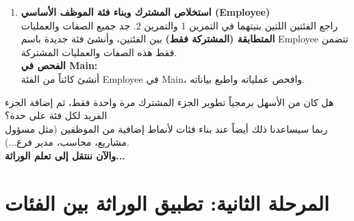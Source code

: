 \documentclass[14pt]{extarticle}
\begin{document}
\begin{enumerate}[label=\textbf{تمرين \arabic*:}, wide=0pt, leftmargin=*, itemsep=2.2em]
    \item \textbf{استخلاص المشترك وبناء فئة الموظف الأساسي (\textenglish{Employee})} \\
    راجع الفئتين اللتين بنيتهما في التمرين 1 والتمرين 2. جد جميع الصفات والعمليات \textbf{المتطابقة (المشتركة فقط)} بين الفئتين، وأنشئ فئة جديدة باسم \textenglish{Employee} تتضمن فقط هذه الصفات والعمليات المشتركة. \\
    \textbf{الفحص في \textenglish{Main}:} \\
    أنشئ كائناً من الفئة \textenglish{Employee} في \textenglish{Main}، وافحص عملياته واطبع بياناته.

\end{enumerate}

\begin{boxAttention}
هل كان من الأسهل برمجياً تطوير الجزء المشترك مرة واحدة فقط، ثم إضافة الجزء الفريد لكل فئة على حدة؟ \\
ربما سيساعدنا ذلك أيضاً عند بناء فئات لأنماط إضافية من الموظفين (مثل مسؤول مشاريع، محاسب، مدير فرع...). \\
\textbf{والآن ننتقل إلى تعلم الوراثة...}
\end{boxAttention}

\clearpage

\section*{المرحلة الثانية: تطبيق الوراثة بين الفئات}
\end{document}
